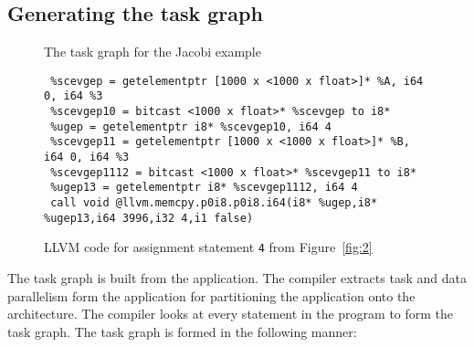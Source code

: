 \subsection{Generating the task graph}
\label{sec:build-appl-graph}

\begin{figure*}[t!]
  \centering
  \scalebox{0.37}{}
  \caption{The task graph for the Jacobi example}
  \label{fig:1}
\end{figure*}

\begin{figure*}[t!]
  \centering
\begin{verbatim}
 %scevgep = getelementptr [1000 x <1000 x float>]* %A, i64 0, i64 %3
 %scevgep10 = bitcast <1000 x float>* %scevgep to i8*
 %ugep = getelementptr i8* %scevgep10, i64 4
 %scevgep11 = getelementptr [1000 x <1000 x float>]* %B, i64 0, i64 %3
 %scevgep1112 = bitcast <1000 x float>* %scevgep11 to i8*
 %ugep13 = getelementptr i8* %scevgep1112, i64 4
 call void @llvm.memcpy.p0i8.p0i8.i64(i8* %ugep,i8* %ugep13,i64 3996,i32 4,i1 false)
\end{verbatim}
  \caption{LLVM code for assignment statement \texttt{4} from
    Figure~\ref{fig:2}}
  \label{fig:3}
\end{figure*}

The task graph is built from the application. The compiler extracts task
and data parallelism form the application for partitioning the
application onto the architecture. The compiler looks at every statement
in the program to form the task graph. The task graph is formed in the
following manner:

